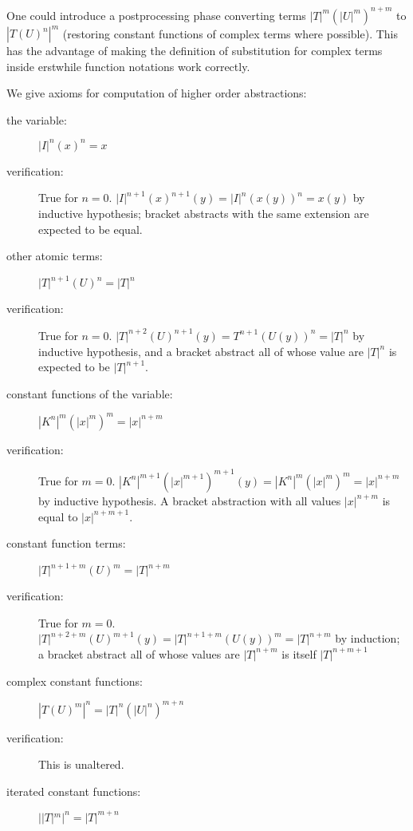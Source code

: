 \documentclass{article}
\begin{document}
One could introduce a postprocessing phase converting terms
$|T|^m(|U|^m)^{n+m}$ to $|T(U)^n|^m$ (restoring constant functions of
complex terms where possible).  This has the advantage of making the
definition of substitution for complex terms inside erstwhile function
notations work correctly.

We give axioms for computation of higher order abstractions:

\begin{description}

\item[the variable:] $|I|^n(x)^n=x$

\item[verification:]  True for $n=0$.  $|I|^{n+1}(x)^{n+1}(y) =
|I|^n(x(y))^n = x(y)$ by inductive hypothesis; bracket abstracts
with the same extension are expected to be equal.

\item[other atomic terms:]  $|T|^{n+1}(U)^n = |T|^n$

\item[verification:]  True for $n=0$.  $|T|^{n+2}(U)^{n+1}(y) =
T^{n+1}(U(y))^n = |T|^n$ by inductive hypothesis, and a bracket abstract
all of whose value are $|T|^n$ is expected to be $|T|^{n+1}$.

\item[constant functions of the variable:]  $|K^n|^m(|x|^m)^m=|x|^{n+m}$

\item[verification:]  True for $m=0$.  $|K^{n}|^{m+1}(|x|^{m+1})^{m+1}(y)=
|K^n|^m(|x|^m)^m = |x|^{n+m}$ by inductive hypothesis.  A bracket abstraction
with all values $|x|^{n+m}$ is equal to $|x|^{n+m+1}$.

\item[constant function terms:]  $|T|^{n+1+m}(U)^m = |T|^{n+m}$

\item[verification:]  True for $m=0$.  $|T|^{n+2+m}(U)^{m+1}(y)
= |T|^{n+1+m}(U(y))^m = |T|^{n+m}$ by induction; a bracket abstract
all of whose values are $|T|^{n+m}$ is itself $|T|^{n+m+1}$

\item[complex constant functions:] $|T(U)^m|^n = |T|^n(|U|^n)^{m+n}$

\item[verification:]  This is unaltered.

\item[iterated constant functions:] $||T|^m|^n = |T|^{m+n}$


\end{description}
\end{document}
